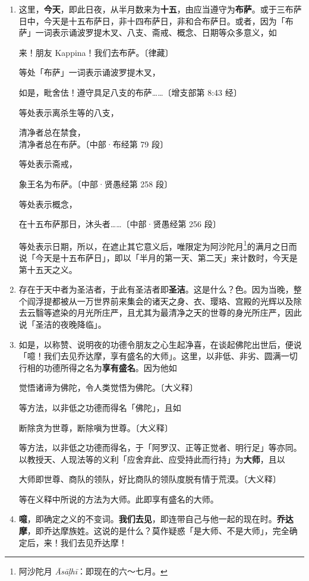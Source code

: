 \begin{enumerate}
\item 这里，\textbf{今天}，即此日夜，从半月数来为\textbf{十五}，由应当遵守为\textbf{布萨}。或于三布萨日中，今天是十五布萨日，非十四布萨日，非和合布萨日。或者，因为「布萨」一词表示诵波罗提木叉、八支、斋戒、概念、日期等众多意义，如\begin{quoting}来！朋友 Kappina！我们去布萨。{\bluefootnotesize 〔律藏〕}\end{quoting}等处「布萨」一词表示诵波罗提木叉，\begin{quoting}如是，毗舍佉！遵守具足八支的布萨……{\bluefootnotesize 〔增支部第 8:43 经〕}\end{quoting}等处表示离杀生等的八支，\begin{quoting}清净者总在禁食，\\清净者总在布萨。{\bluefootnotesize 〔中部·布经第 79 段〕}\end{quoting}等处表示斋戒，\begin{quoting}象王名为布萨。{\bluefootnotesize 〔中部·贤愚经第 258 段〕}\end{quoting}等处表示概念，\begin{quoting}在十五布萨那日，沐头者……{\bluefootnotesize 〔中部·贤愚经第 256 段〕}\end{quoting}等处表示日期，所以，在遮止其它意义后，唯限定为阿沙陀月\footnote{阿沙陀月 \textit{Āsāḷhī}：即现在的六～七月。}的满月之日而说「今天是十五布萨日」，即以「半月的第一天、第二天」来计数时，今天是第十五天之义。
\item 存在于天中者为圣洁者，于此有圣洁者即\textbf{圣洁}。这是什么？色。因为当晚，整个阎浮提都被从一万世界前来集会的诸天之身、衣、璎珞、宫殿的光辉以及除去云翳等遮染的月光所庄严，且尤其为最清净之天的世尊的身光所庄严，因此说「圣洁的夜晚降临」。
\item 如是，以称赞、说明夜的功德令朋友之心生起净喜，在谈起佛陀出世后，便说「噫！我们去见乔达摩，享有盛名的大师」。这里，以非低、非劣、圆满一切行相的功德所得之名为\textbf{享有盛名}。因为他如\begin{quoting}觉悟诸谛为佛陀，令人类觉悟为佛陀。{\bluefootnotesize 〔大义释〕}\end{quoting}等方法，以非低之功德而得名「佛陀」，且如\begin{quoting}断除贪为世尊，断除嗔为世尊。{\bluefootnotesize 〔大义释〕}\end{quoting}等方法，以非低之功德而得名，于「阿罗汉、正等正觉者、明行足」等亦同。以教授天、人现法等的义利「应舍弃此、应受持此而行持」为\textbf{大师}，且以\begin{quoting}大师即世尊、商队的领队，好比商队的领队度脱有情于荒漠。{\bluefootnotesize 〔大义释〕}\end{quoting}等在义释中所说的方法为大师。此即享有盛名的大师。
\item \textbf{噫}，即确定之义的不变词。\textbf{我们去见}，即连带自己与他一起的现在时。\textbf{乔达摩}，即乔达摩族姓。这说的是什么？莫作疑惑「是大师、不是大师」，完全确定后，来！我们去见乔达摩！\end{enumerate}


